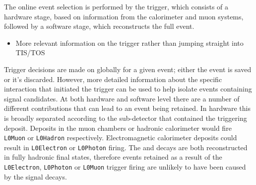 The online event selection is performed by the \lhcb trigger, which consists of a hardware stage, based on information from the calorimeter and muon
systems, followed by a software stage, which reconstructs the full event.

 


{\color{Red}
\begin{itemize}
\item More relevant information on the trigger rather than jumping straight into TIS/TOS
\end{itemize}
}
Trigger decisions are made on globally for a given event; either the event is saved or it's discarded. However, more detailed information about the specific interaction that initiated the trigger can be used to help isolate events containing signal candidates. At both hardware and software level there are a number of different contributions that can lead to an event being retained. In hardware this is broadly separated according to the sub-detector that contained the triggering deposit. Deposits in the muon chambers or hadronic calorimeter would fire \texttt{L0Muon} or \texttt{L0Hadron} respectively. Electromagnetic calorimeter deposits could result in \texttt{L0Electron} or \texttt{L0Photon} firing. The \decay{\Bp}{\Dsp\Kp\Km} and \decay{\Bp}{\Dsp}{\phiz} decays are both reconstructed in fully hadronic final states, therefore events retained as a result of the \texttt{L0Electron}, \texttt{L0Photon} or \texttt{L0Muon} trigger firing are unlikely to have been caused by the signal decays. 

